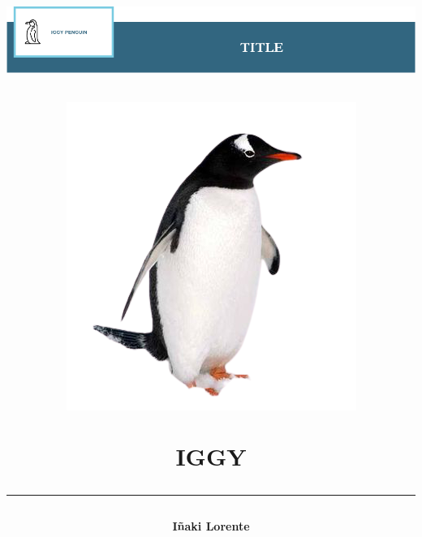 
\title
{
	\author{\large\textbf{Iñaki Lorente}\vspace{4em}}
	\centerline{\includegraphics[scale=0.5]{figures/penguinheader.png}}
	\vspace{25mm}
	\centerline{\includegraphics[scale=0.2]{figures/iggy.png}}
	\selectfont \textbf{IGGY}
	\vfill
	\color{dark_blue} \rule{\linewidth}{0.4mm}
	\thispagestyle{empty}	
}
